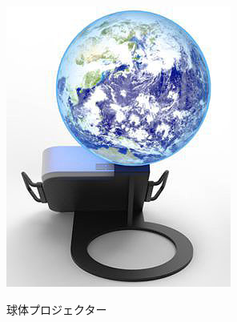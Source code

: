 \begin{figure}[tp]
  \centering
  \includegraphics[scale=1.4]{fig/Glomal350.jpg}
  \caption{球体プロジェクター}\cite{15}
\end{figure}

